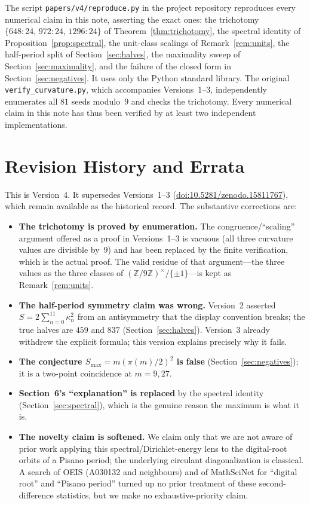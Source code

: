 \documentclass[12pt]{article}
\theoremstyle{remark}
\begin{document}
The script \texttt{papers/v4/reproduce.py} in the project repository reproduces every
numerical claim in this note, asserting the exact ones: the trichotomy
$\{648{:}24,\,972{:}24,\,1296{:}24\}$ of Theorem~\ref{thm:trichotomy}, the spectral
identity of Proposition~\ref{prop:spectral}, the unit-class scalings of
Remark~\ref{rem:units}, the half-period split of Section~\ref{sec:halves}, the maximality
sweep of Section~\ref{sec:maximality}, and the failure of the closed form in
Section~\ref{sec:negatives}. It uses only the Python standard library. The original
\texttt{verify\_curvature.py}, which accompanies Versions~1--3, independently enumerates
all $81$ seeds modulo~$9$ and checks the trichotomy. Every numerical claim in this note has
thus been verified by at least two independent implementations.

\section{Revision History and Errata}\label{sec:errata}

This is Version~4. It supersedes Versions~1--3
(\href{https://doi.org/10.5281/zenodo.15811767}{doi:10.5281/zenodo.15811767}), which
remain available as the historical record. The substantive corrections are:
\begin{itemize}
\item \textbf{The trichotomy is proved by enumeration.} The congruence/``scaling''
argument offered as a proof in Versions~1--3 is vacuous (all three curvature values are
divisible by~$9$) and has been replaced by the finite verification, which is the actual
proof. The valid residue of that argument---the three values as the three classes of
$(\mathbb Z/9\mathbb Z)^\times/\{\pm1\}$---is kept as Remark~\ref{rem:units}.
\item \textbf{The half-period symmetry claim was wrong.} Version~2 asserted
$S=2\sum_{n=0}^{11}\kappa_n^2$ from an antisymmetry that the display convention breaks; the
true halves are $459$ and $837$ (Section~\ref{sec:halves}). Version~3 already withdrew the
explicit formula; this version explains precisely why it fails.
\item \textbf{The conjecture $S_{\max}=m(\pi(m)/2)^2$ is false}
(Section~\ref{sec:negatives}); it is a two-point coincidence at $m=9,27$.
\item \textbf{Section~6's ``explanation'' is replaced} by the spectral identity
(Section~\ref{sec:spectral}), which is the genuine reason the maximum is what it is.
\item \textbf{The novelty claim is softened.} We claim only that we are not aware of prior
work applying this spectral/Dirichlet-energy lens to the digital-root orbits of a Pisano
period; the underlying circulant diagonalization is classical. A search of OEIS
(A030132 and neighbours) and of MathSciNet for ``digital root'' and ``Pisano period''
turned up no prior treatment of these second-difference statistics, but we make no
exhaustive-priority claim.
\end{itemize}
\end{document}
